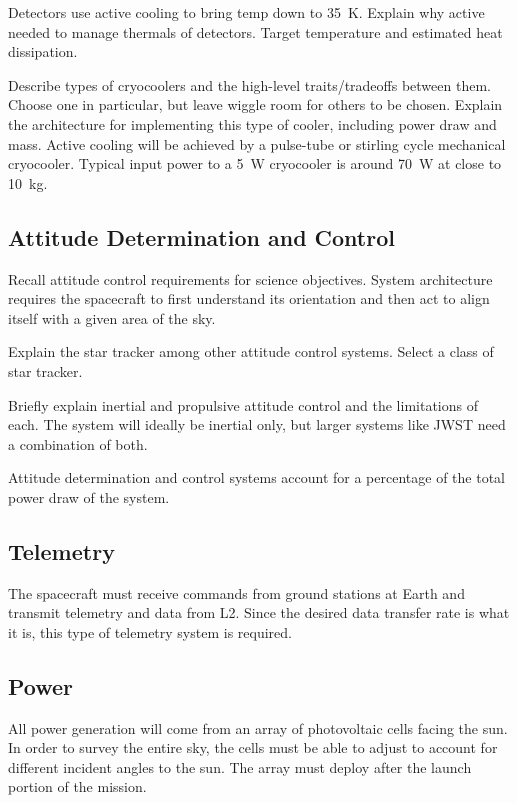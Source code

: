 \documentclass{ws-jai}
\begin{document}
Detectors use active cooling to bring temp down to \SI{35}{\kelvin}.
Explain why active needed to manage thermals of detectors.
Target temperature and estimated heat dissipation.

Describe types of cryocoolers and the high-level traits/tradeoffs between them. Choose one in particular, but leave wiggle room for others to be chosen.
Explain the architecture for implementing this type of cooler, including power draw and mass.
Active cooling will be achieved by a pulse-tube or stirling cycle mechanical cryocooler.
Typical input power to a \SI{5}{\watt} cryocooler is around \SI{70}{\watt} at close to \SI{10}{\kilo\gram}.

\subsection{Attitude Determination and Control}
\label{sS:adcs}
Recall attitude control requirements for science objectives.
System architecture requires the spacecraft to first understand its orientation and then act to align itself with a given area of the sky.

Explain the star tracker among other attitude control systems.
Select a class of star tracker.

Briefly explain inertial and propulsive attitude control and the limitations of each.
The system will ideally be inertial only, but larger systems like JWST need a combination of both.

Attitude determination and control systems account for a percentage of the total power draw of the system.

\subsection{Telemetry}
\label{sS:telemetry}
The spacecraft must receive commands from ground stations at Earth and transmit telemetry and data from L2.
Since the desired data transfer rate is what it is, this type of telemetry system is required.

\subsection{Power}
\label{sS:power}
All power generation will come from an array of photovoltaic cells facing the sun.
In order to survey the entire sky, the cells must be able to adjust to account for different incident angles to the sun.
The array must deploy after the launch portion of the mission.
\end{document}
